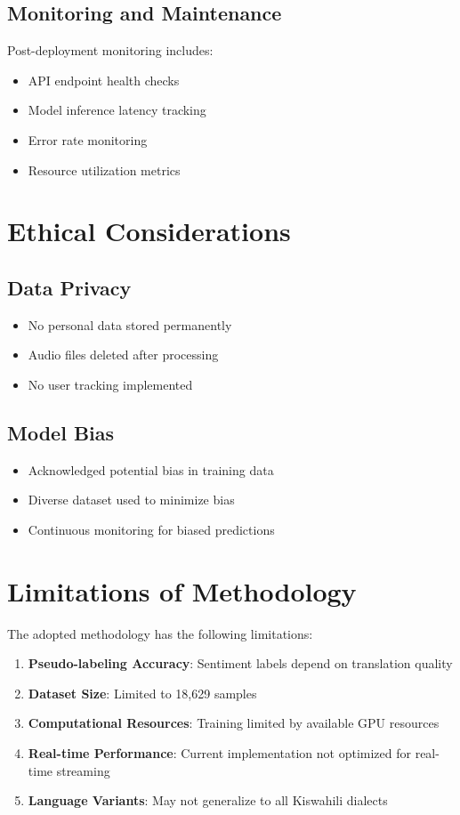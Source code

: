 \documentclass[12pt,a4paper]{report}
\begin{document}
\subsection{Monitoring and Maintenance}
Post-deployment monitoring includes:

\begin{itemize}
    \item API endpoint health checks
    \item Model inference latency tracking
    \item Error rate monitoring
    \item Resource utilization metrics
\end{itemize}

\section{Ethical Considerations}
\subsection{Data Privacy}
\begin{itemize}
    \item No personal data stored permanently
    \item Audio files deleted after processing
    \item No user tracking implemented
\end{itemize}

\subsection{Model Bias}
\begin{itemize}
    \item Acknowledged potential bias in training data
    \item Diverse dataset used to minimize bias
    \item Continuous monitoring for biased predictions
\end{itemize}

\section{Limitations of Methodology}
The adopted methodology has the following limitations:

\begin{enumerate}
    \item \textbf{Pseudo-labeling Accuracy}: Sentiment labels depend on translation quality
    \item \textbf{Dataset Size}: Limited to 18,629 samples
    \item \textbf{Computational Resources}: Training limited by available GPU resources
    \item \textbf{Real-time Performance}: Current implementation not optimized for real-time streaming
    \item \textbf{Language Variants}: May not generalize to all Kiswahili dialects
\end{enumerate}
\end{document}
